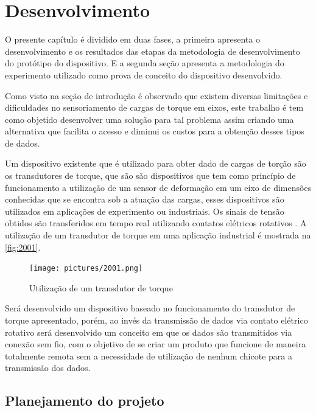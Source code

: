 
\chapter{Desenvolvimento}

O presente capítulo é dividido em duas fases, a primeira apresenta o desenvolvimento e os resultados das etapas da metodologia de desenvolvimento do protótipo do dispositivo.
E a segunda seção apresenta a metodologia do experimento utilizado como prova de conceito do dispositivo desenvolvido.

Como visto na seção de introdução é observado que existem diversas limitações e dificuldades no sensoriamento de cargas de torque em eixos, este trabalho é tem como objetido
desenvolver uma solução para tal problema assim criando uma alternativa que facilita o acesso e diminui os custos para a obtenção desses tipos de dados.

Um dispositivo existente que é utilizado para obter dado de cargas de torção são os transdutores de torque, que são são dispositivos que tem como princípio de funcionamento
a utilização de um sensor de deformação em um eixo de dimensões conhecidas que se encontra sob a atuação das cargas, esses dispositivos são utilizados em aplicações de experimento
ou industriais.
Os sinais de tensão obtidos são transferidos em tempo real utilizando contatos elétricos rotativos \autocite{Kyowa}.
A utilização de um transdutor de torque em uma aplicação industrial é mostrada na \autoref{fig:2001}.

\begin{figure}[htb]
	\caption{\label{fig:2001} Utilização de um transdutor de torque}
	\begin{center}
		\texttt{[image: pictures/2001.png]}
	\end{center}
\end{figure}

Será desenvolvido um dispositivo baseado no funcionamento do transdutor de torque apresentado, porém, ao invés da transmissão de dados via contato elétrico rotativo será
desenvolvido um conceito em que os dados são transmitidos via conexão sem fio, com o objetivo de se criar um produto que funcione de maneira totalmente remota sem a necessidade
de utilização de nenhum chicote para a transmissão dos dados.

\section{Planejamento do projeto}

